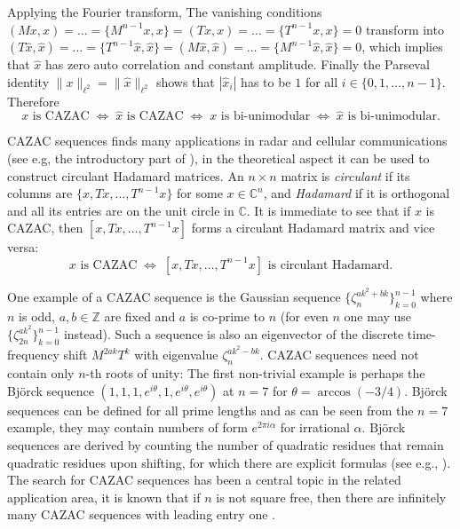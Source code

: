 \documentclass[A4,11pt]{article}
\newcommand{\norm}[1]{\|#1\|_{\ell^2}}
\begin{document}
Applying the Fourier transform, The vanishing conditions $(Mx, x)=\dots=\{M^{n-1}x, x\}=(Tx, x)=\dots=\{T^{n-1}x, x\}=0$ transform into $(T\hat x,\hat x)=\dots=\{T^{n-1}\hat x,\hat x\}=(M\hat x,\hat x)=\dots=\{M^{n-1}\hat x,\hat x\}=0$, which implies that $\hat x$ has zero auto correlation and constant amplitude. Finally the Parseval identity $\norm{x}=\norm{\hat x}$ shows that $|\hat x_i|$ has to be $1$ for all $i\in\{0,1,\ldots,n-1\}$. Therefore
\begin{equation} \label{EqCB}
x \text{ is CAZAC} \;\Leftrightarrow\; \hat x \text{ is CAZAC} \;\Leftrightarrow\; x \text{ is bi-unimodular} \;\Leftrightarrow\; \hat x \text{ is bi-unimodular}.
\end{equation}

CAZAC sequences finds many applications in radar and cellular communications (see e.g, the introductory part of \cite{benedetto2019}), in the theoretical aspect it can be used to construct circulant Hadamard matrices. An $n\times n$ matrix is \emph{circulant} if its columns are $\{x,Tx,\ldots,T^{n-1}x\}$ for some $x\in\mathbb C^n$, and \emph{Hadamard} if it is orthogonal and all its entries are on the unit circle in $\mathbb C$. It is immediate to see that if $x$ is CAZAC, then $[x,Tx,\ldots,T^{n-1}x]$ forms a circulant Hadamard matrix and vice versa:
$$x \text{ is CAZAC} \;\Leftrightarrow\; [x,Tx,\ldots,T^{n-1}x] \text{ is circulant Hadamard}.$$

One example of a CAZAC sequence is the Gaussian sequence $\{\zeta_n^{ak^2+bk}\}_{k=0}^{n-1}$ where $n$ is odd, $a,b\in\mathbb Z$ are fixed and $a$ is co-prime to $n$ (for even $n$ one may use $\{\zeta_{2n}^{ak^2}\}_{k=0}^{n-1}$ instead). Such a sequence is also an eigenvector of the discrete time-frequency shift $M^{2ak}T^k$ with eigenvalue $\zeta_n^{ak^2-bk}$. CAZAC sequences need not contain only $n$-th roots of unity: The first non-trivial example is perhaps the Bj{\"o}rck sequence $(1,1,1,e^{i\theta},1,e^{i\theta},e^{i\theta})$ at $n=7$ for $\theta=\arccos(-3/4)$. Bj{\"o}rck sequences can be defined for all prime lengths \cite[Section 4.1]{benedetto2019} and as can be seen from the $n=7$ example, they may contain numbers of form $e^{2\pi i\alpha}$ for irrational $\alpha$. Bj{\"o}rck sequences are derived by counting the number of quadratic residues that remain quadratic residues upon shifting, for which there are explicit formulas (see e.g., \cite{perron1952}). The search for CAZAC sequences has been a central topic in the related application area, it is known that if $n$ is not square free, then there are infinitely many CAZAC sequences with leading entry one \cite{backelin1989,bjorck1995}.
\end{document}

